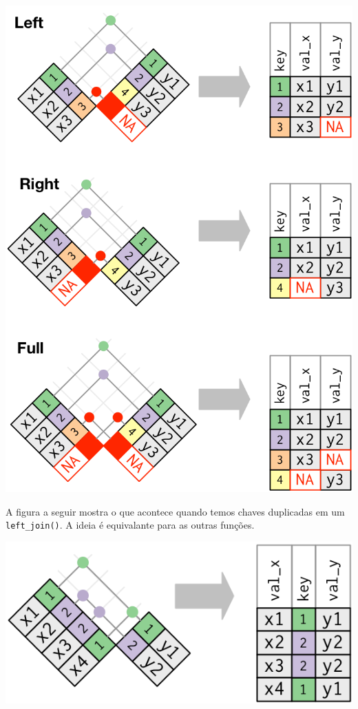 \documentclass[
]{book}
\begin{document}
\begin{center}\includegraphics[width=9.86in]{img/manipulacao/joins} \end{center}

A figura a seguir mostra o que acontece quando temos chaves duplicadas em um \texttt{left\_join()}. A ideia é equivalante para as outras funções.

\begin{center}\includegraphics[width=7.75in]{img/manipulacao/left-join} \end{center}
\end{document}

